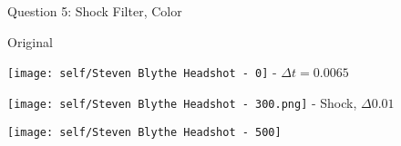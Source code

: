 \newpage
\item Question 5: Shock Filter, Color
\begin{center}
  \begin{multicols}{3}

    Original

    \texttt{[image: self/Steven Blythe Headshot - 0]}
     - $\Delta t = 0.0065$

    \texttt{[image: self/Steven Blythe Headshot - 300.png]}
     - Shock, $\Delta 0.01$

    \texttt{[image: self/Steven Blythe Headshot - 500]}
  \end{multicols}
\end{center}

